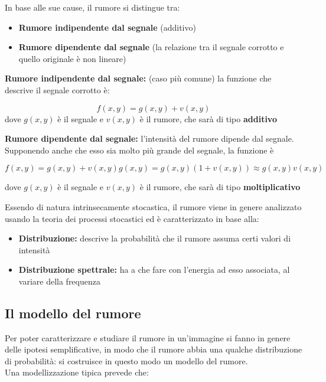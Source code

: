 In base alle sue cause, il rumore si distingue tra:
\begin{itemize}
    \item \textbf{Rumore indipendente dal segnale} (additivo)
    \item \textbf{Rumore dipendente dal segnale} (la relazione tra il segnale
          corrotto e quello originale è non lineare)
\end{itemize}

\begin{trivlist}
    \item \textbf{Rumore indipendente dal segnale:} (caso più comune) la
    funzione che descrive il segnale corrotto è:

    $$
        f(x,y) = g(x,y)+v(x,y)
    $$
    dove $g(x,y)$ è il segnale e $v(x,y)$ è il rumore, che sarà di tipo
    \textbf{additivo}

    \item \textbf{Rumore dipendente dal segnale:} l'intensità del rumore dipende
    dal segnale. Supponendo anche che esso sia molto più grande del segnale, la
    funzione è

    $$
        f(x,y)=g(x,y)+v(x,y)g(x,y)=g(x,y)(1+v(x,y)) \approx g(x,y)v(x,y)
    $$

    dove $g(x,y)$ è il segnale e $v(x,y)$ è il rumore, che sarà di tipo
    \textbf{moltiplicativo}
\end{trivlist}

Essendo di natura intrinsecamente stocastica, il rumore viene in genere
analizzato usando la teoria dei processi stocastici ed è caratterizzato in base
alla:

\begin{itemize}
    \item \textbf{Distribuzione:} descrive la probabilità che il rumore assuma
          certi valori di intensità
    \item \textbf{Distribuzione spettrale:} ha a che fare con l'energia ad esso
          associata, al variare della frequenza
\end{itemize}

\subsection{Il modello del rumore}

Per poter caratterizzare e studiare il rumore in un'immagine si fanno in genere
delle ipotesi semplificative, in modo che il rumore abbia una qualche
distribuzione di probabilità: si costruisce in questo modo un modello del
rumore. \\Una modellizzazione tipica prevede che:

